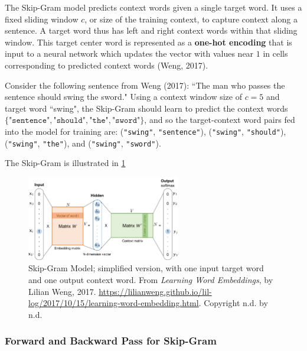 The Skip-Gram model predicts context words given a single target word. It uses a fixed sliding window $c$, or size of the training context, to capture context along a sentence. A target word thus has left and right context words within that sliding window. This target center word is represented as a \textbf{one-hot encoding} that is input to a neural network which updates the vector with values near $1$ in cells corresponding to predicted context words (Weng, 2017).

Consider the following sentence from Weng (2017): ``The man who passes the sentence should swing the sword." Using a context window size of $c = 5$ and target word ``swing", the Skip-Gram should learn to predict the context words $\{\texttt{"sentence"}, \texttt{"should"}, \texttt{"the"}, \texttt{"sword"} \}$, and so the target-context word pairs fed into the model for training are: (\texttt{"swing"}, \texttt{"sentence"}), (\texttt{"swing"}, \texttt{"should"}), (\texttt{"swing"}, \texttt{"the"}), and (\texttt{"swing"}, \texttt{"sword"}). 

The Skip-Gram is illustrated in \cref{fig:SkipGram}

\begin{figure}[h]
\vspace{-5pt}
\centering
\includegraphics[width=0.6\textwidth]{imgs/skipgram_image.png}
\vspace{-5pt}
\caption{\footnotesize Skip-Gram Model; simplified version, with one input target word and one output context word. From \emph{Learning Word Embeddings}, by Lilian Weng, 2017. \url{https://lilianweng.github.io/lil-log/2017/10/15/learning-word-embedding.html}. Copyright n.d. by n.d.}
\label{fig:SkipGram}
\vspace{-5pt}
\end{figure}

\subsubsection{Forward and Backward Pass for Skip-Gram}

